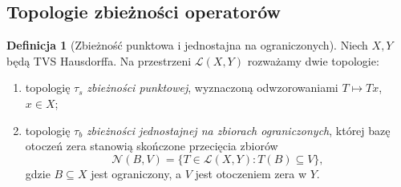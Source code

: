 \documentclass[11pt,a4paper]{article}
\numberwithin{equation}{section}
\theoremstyle{plain}
\theoremstyle{definition}
\newtheorem{definicja}[twierdzenie]{Definicja}
\theoremstyle{remark}
\begin{document}
\subsection{Topologie zbieżności operatorów}

\begin{definicja}[Zbieżność punktowa i jednostajna na ograniczonych]
\label{def:operator-topologies}
Niech $X,Y$ będą TVS Hausdorffa. Na przestrzeni
$\mathcal L(X,Y)$ rozważamy dwie topologie:
\begin{enumerate}[label=\textup{(\roman*)}]
\item topologię $\tau_s$ \emph{zbieżności punktowej},
wyznaczoną odwzorowaniami $T\mapsto Tx$, $x\in X$;
\item topologię $\tau_b$ \emph{zbieżności jednostajnej na
zbiorach ograniczonych}, której bazę otoczeń zera
stanowią skończone przecięcia zbiorów
\[
 \mathcal N(B,V)=\{T\in\mathcal L(X,Y):T(B)\subseteq V\},
\]
gdzie $B\subseteq X$ jest ograniczony, a $V$ jest
otoczeniem zera w $Y$.
\end{enumerate}
\end{definicja}
\end{document}
